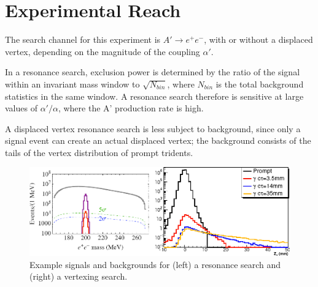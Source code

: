 \documentclass[b1]{sciposter}
\begin{document}
\begin{multicols}{3}
\begin{small}
% 
\end{small}
\columnbreak
	\section*{Experimental Reach}
	The search channel for this experiment is $A'\to e^+e^-$, with or without a displaced vertex, depending on the magnitude of the coupling $\alpha'$.

	In a resonance search, exclusion power is determined by the ratio of the signal within an invariant mass window to $\sqrt{N_{bin}}$, where $N_{bin}$ is the total background statistics in the same window. A resonance search therefore is sensitive at large values of $\alpha'/\alpha$, where the A' production rate is high.

	A displaced vertex resonance search is less subject to background, since only a signal event can create an actual displaced vertex; the background consists of the tails of the vertex distribution of prompt tridents.
	\begin{figure}
		\begin{center}
			\includegraphics[width=\textwidth]{s_b}
		\end{center}
		\caption{Example signals and backgrounds for (left) a resonance search and (right) a vertexing search.}
	\end{figure}


\end{multicols}
\end{document}
